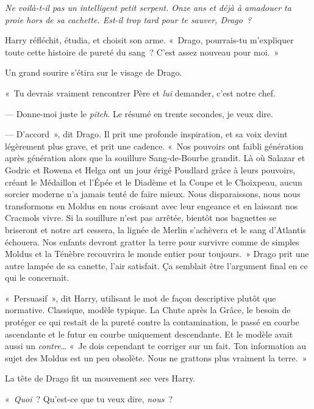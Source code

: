 \emph{Ne voilà-t-il pas un intelligent petit serpent. Onze ans et déjà à amadouer ta proie hors de sa cachette. Est-il trop tard pour te sauver, Drago~?}

Harry réfléchit, étudia, et choisit son arme. «~Drago, pourrais-tu m'expliquer toute cette histoire de pureté du sang~? C'est assez nouveau pour moi.~»

Un grand sourire s'étira sur le visage de Drago.

«~Tu devrais vraiment rencontrer Père et \emph{lui} demander, c'est notre chef.

--- Donne-moi juste le \emph{pitch}\footnotemark{}. Le résumé en trente secondes, je veux dire.

--- D'accord~», dit Drago. Il prit une profonde inspiration, et sa voix devint légèrement plus grave, et prit une cadence. «~Nos pouvoirs ont faibli génération après génération alors que la souillure Sang-de-Bourbe grandit. Là où Salazar et Godric et Rowena et Helga ont un jour érigé Poudlard grâce à leurs pouvoirs, créant le Médaillon et l'Épée et le Diadème et la Coupe et le Choixpeau, aucun sorcier moderne n'a jamais tenté de faire mieux. Nous disparaissons, nous nous transformons en Moldus en nous croisant avec leur engeance et en laissant nos Cracmols vivre. Si la souillure n'est pas arrêtée, bientôt nos baguettes se briseront et notre art cessera, la lignée de Merlin s'achèvera et le sang d'Atlantis échouera. Nos enfants devront gratter la terre pour survivre comme de simples Moldus et la Ténèbre recouvrira le monde entier pour toujours.~» Drago prit une autre lampée de sa canette, l'air satisfait. Ça semblait être l'argument final en ce qui le concernait.

«~Persuasif~», dit Harry, utilisant le mot de façon descriptive plutôt que normative. Classique, modèle typique. La Chute après la Grâce, le besoin de protéger ce qui restait de la pureté contre la contamination, le passé en courbe ascendante et le futur en courbe uniquement descendante. Et le modèle avait aussi un \emph{contre}… «~Je dois cependant te corriger sur un fait. Ton information au sujet des Moldus est un peu obsolète. Nous ne grattons plus vraiment la terre.~»

La tête de Drago fit un mouvement sec vers Harry.

«~\emph{Quoi}~? Qu'est-ce que tu veux dire, \emph{nous}~?

